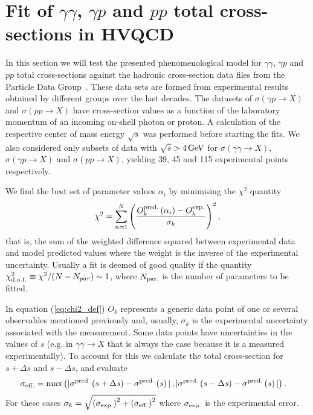 \documentclass[a4paper,12pt]{article}
\begin{document}
\section{Fit of $\gamma \gamma $, $\gamma p$ and $pp$ total cross-sections in HVQCD}
In this section we will test the presented phenomenological model for $\gamma \gamma $, $\gamma p$ and $pp$ total cross-sections against the hadronic cross-section data files from the Particle Data Group~\cite{pdg_2018}. These data sets are formed from experimental results obtained by different groups over the last decades. The datasets of  $\sigma\left(\gamma p \rightarrow X\right)$ and $\sigma\left(p p \rightarrow X\right)$ have cross-section values as a function of the laboratory momentum of an incoming on-shell photon or proton. A calculation of the respective center of mass energy $\sqrt{s}$ was performed before starting the fits. We also considered only subsets of data with $\sqrt{s} > 4 \, {\rm GeV}$ for $\sigma\left(\gamma \gamma \rightarrow X\right)$, $\sigma\left(\gamma p \rightarrow X\right)$ and $\sigma\left(p p \rightarrow X\right)$,  yielding 39, 45 and 115 experimental points respectively. 

We find the best set of parameter values $\alpha_i$ by minimising the $\chi^2$ quantity
\begin{align}
\chi^2 = \sum_{n = 1}^{N} {\left( \frac{O^{{\rm pred.}}_k\left(\alpha_i\right) - O^{{\rm exp.}}_k}{\sigma_k} \right)}^2 \, ,
\label{eq:chi2_def}
\end{align}
that is, the sum of the weighted difference squared between experimental data and model predicted values where the weight is the inverse of the experimental uncertainty. Usually a fit is deemed of good quality if the quantity $\chi^2_{\rm d.o.f.} \equiv \chi^2 / (N - N_{par}) \sim 1$, where $N_{\rm par.}$ is the number of parameters to be fitted. 

In equation (\ref{eq:chi2_def}) $O_k$ represents a generic data point of one or several observables mentioned previously and, usually,  $\sigma_k$ is the experimental uncertainty associated with the measurement.
Some data points have uncertainties in the values of $s$ (e.g. in $\gamma \gamma \rightarrow X$ that is always the case because it is a measured experimentally). To account for this we calculate the total cross-section for $s + \Delta s$ and $s - \Delta s$, and evaluate
\begin{align}
\sigma_{\rm {eff.}} = {\rm max} &\left(|\sigma^{\rm pred.}\left(s + \Delta s\right)-\sigma^{\rm pred.}\left(s\right)|\,,  |\sigma^{\rm pred.}\left(s - \Delta s\right)-\sigma^{\rm pred.}\left(s\right)| \right).
\end{align}
For these cases  $\sigma_k = \sqrt{{\left(\sigma_{\rm exp.}\right)}^2+{\left( \sigma_{\rm eff.}\right)} ^2}$ where $\sigma_{\rm exp.}$ is the experimental error.
\end{document}
